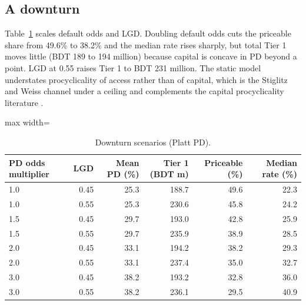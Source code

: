 \documentclass[11pt,a4paper]{article}
\newcommand{\tabsize}{\footnotesize}
\begin{document}
\subsection{A downturn}
Table~\ref{tab:down} scales default odds and LGD. Doubling default odds cuts the priceable share from 49.6\% to 38.2\% and the median rate rises sharply, but total Tier 1 moves little (BDT 189 to 194 million) because capital is concave in PD beyond a point. LGD at 0.55 raises Tier 1 to BDT 231 million. The static model understates procyclicality of access rather than of capital, which is the Stiglitz and Weiss channel under a ceiling and complements the capital procyclicality literature \citep{Repullo2014,Behn2016,Gordy2010}.
\begin{table}[H]\centering\tabsize\caption{Downturn scenarios (Platt PD).}\label{tab:down}
\begin{adjustbox}{max width=\textwidth}
\begin{tabular}{lrrrrr}
\toprule
PD odds multiplier & LGD & Mean PD (\%) & Tier 1 (BDT m) & Priceable (\%) & Median rate (\%) \\
\midrule
1.0 & 0.45 & 25.3 & 188.7 & 49.6 & 22.3 \\
1.0 & 0.55 & 25.3 & 230.6 & 45.8 & 24.2 \\
1.5 & 0.45 & 29.7 & 193.0 & 42.8 & 25.9 \\
1.5 & 0.55 & 29.7 & 235.9 & 38.9 & 28.5 \\
2.0 & 0.45 & 33.1 & 194.2 & 38.2 & 29.3 \\
2.0 & 0.55 & 33.1 & 237.4 & 35.0 & 32.7 \\
3.0 & 0.45 & 38.2 & 193.2 & 32.8 & 36.0 \\
3.0 & 0.55 & 38.2 & 236.1 & 29.5 & 40.9 \\
\bottomrule
\end{tabular}
\end{adjustbox}\end{table}
\end{document}

